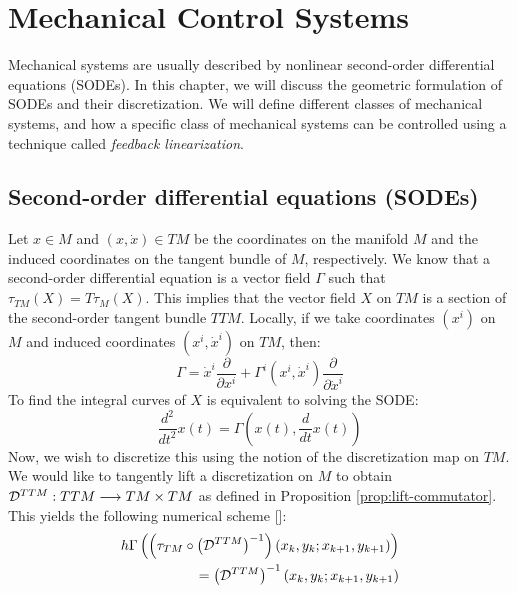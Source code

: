 
\chapter{Mechanical Control Systems} %

\label{chap:sode} %

Mechanical systems are usually described by nonlinear second-order differential equations (SODEs). In this chapter, we will discuss the geometric formulation of SODEs and their discretization. We will define different classes of mechanical systems, and how a specific class of mechanical systems can be controlled using a technique called \textit{feedback linearization}.

\section{Second-order differential equations (SODEs)} 
Let $x \in M$ and $(x, \dot{x}) \in TM$ be the coordinates on the manifold $M$ and the induced coordinates on the tangent bundle of $M$, respectively. We know that a second-order differential equation is a vector field $\Gamma$ such that $\tau_{TM}(X) = T \tau_M (X)$. This implies that the vector field $X$ on $TM$ is a section of the second-order tangent bundle $TTM$. Locally, if we take coordinates $(x^i)$ on $M$ and induced coordinates $(x^i, \dot{x}^i)$ on $TM$, then:
\begin{equation}
    \Gamma = \dot{x}^i \frac{\partial}{\partial x^i} + \Gamma^i(x^i, \dot{x}^i) \frac{\partial}{\partial \dot{x}^i}
\end{equation}
To find the integral curves of $X$ is equivalent to solving the SODE:
\begin{equation}
\label{eq:sode}
    \dfrac{d^2}{dt^2}x(t) = \Gamma \left( x(t), \dfrac{d}{dt}x(t) \right) 
\end{equation}
Now, we wish to discretize this using the notion of the discretization map on $TM$. We would like to tangently lift a discretization on $M$ to obtain $\mathcal{D}^{TTM}: TTM \longrightarrow TM \times TM$ as defined in Proposition \ref{prop:lift-commutator}. This yields the following numerical scheme [\cite{21MBLDMdD}]:
\begin{equation}
\label{eq:disc}
\begin{split}
    h \Gamma \left( \left(\tau_{TM} \circ \left(\mathcal{D}^{TTM}\right)^{-1}\right)(x_k, y_k; x_{k+1}, y_{k+1})\right) \\ = \left(\mathcal{D}^{TTM}\right)^{-1} (x_k, y_k; x_{k+1}, y_{k+1})
\end{split}
\end{equation}

